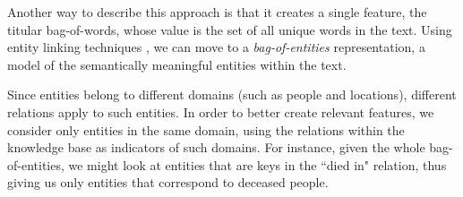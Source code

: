 \documentclass{article}
\theoremstyle{definition}
\begin{document}
Another way to describe this approach is that it creates a single feature, the titular bag-of-words, whose value is the set of all unique words in the text.
Using entity linking techniques \citep{bunescu2006using,rao2013entity}, we can move to a \emph{bag-of-entities} representation, a model of the semantically meaningful entities within the text.


Since entities belong to different domains (such as people and locations), different relations apply to such entities. In order to better create relevant features, we consider only entities in the same domain, using the relations within the knowledge base as indicators of such domains. For instance, given the whole bag-of-entities, we might look at entities that are keys in the ``died in" relation, thus giving us only entities that correspond to deceased people.

\end{document}
